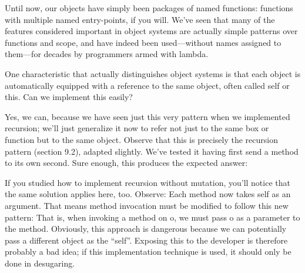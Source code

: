 
Until now, our objects have simply been packages of named functions: functions
with multiple named entry-points, if you will. We’ve seen that many of the
features considered important in object systems are actually simple patterns
over functions and scope, and have indeed been used—without names assigned to
them—for decades by programmers armed with lambda.

One characteristic that actually distinguishes object systems is that each
object is automatically equipped with a reference to the same object, often
called self or this. Can we implement this easily?

\secdown


Yes, we can, because we have seen just this very pattern when we implemented
recursion; we’ll just generalize it now to refer not just to the same box or
function but to the same object.
Observe that this is precisely the recursion pattern (section 9.2), adapted
slightly. We’ve tested it having first send a method to its own second. Sure
enough, this produces the expected answer:


If you studied how to implement recursion without mutation, you’ll notice that
the same solution applies here, too. Observe:
Each method now takes self as an argument. That means method invocation must be
modified to follow this new pattern:
That is, when invoking a method on o, we must pass o as a parameter to the
method. Obviously, this approach is dangerous because we can potentially pass a
different object as the “self”. Exposing this to the developer is therefore
probably a bad idea; if this implementation technique is used, it should only be
done in desugaring.

\secup